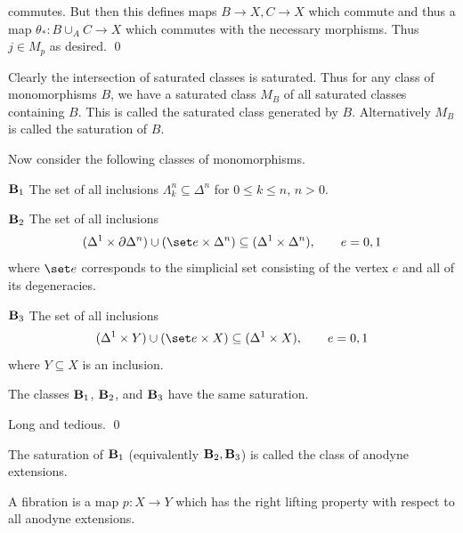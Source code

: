     \centerline{}

    commutes.
    But then this defines maps $B\to X,C\to X$ which commute and thus a map $\theta_*\colon B\cup_AC\to X$ which
    commutes with the necessary morphisms.
    Thus $j\in M_p$ as desired.
    \qed

\eproof

Clearly the intersection of saturated classes is saturated.
Thus for any class of monomorphisms $B$, we have a saturated class $M_B$ of all saturated classes containing $B$.
This is called the saturated class {\emphcolor generated} by $B$.
Alternatively $M_B$ is called the {\emphcolor saturation} of $B$.

Now consider the following classes of monomorphisms.
\bitems{1cm}
    \item{${\bf B}_1$} The set of all inclusions $\Lambda^n_k\subseteq\Delta^n$ for $0\leq k\leq n$, $n>0$.
    \item{${\bf B}_2$} The set of all inclusions
    $$ (\Delta^1\times\partial\Delta^n) \cup (\set e\times\Delta^n) \subseteq (\Delta^1\times\Delta^n),\qquad e=0,1 $$
    where $\set e$ corresponds to the simplicial set consisting of the vertex $e$ and all of its degeneracies.
    \item{${\bf B}_3$} The set of all inclusions
    $$ (\Delta^1\times Y) \cup (\set e\times X) \subseteq (\Delta^1\times X),\qquad e=0,1 $$
    where $Y\subseteq X$ is an inclusion.
\eitems

\bprop

    The classes ${\bf B}_1$, ${\bf B}_2$, and ${\bf B}_3$ have the same saturation.

\eprop

\bproof

    Long and tedious.\CITE
    \qed

\eproof

\bdefn

    The saturation of ${\bf B}_1$ (equivalently ${\bf B}_2,{\bf B}_3$) is called the class of {\emphcolor anodyne extensions}.

\edefn

\bcoro

    A fibration is a map $p\colon X\to Y$ which has the right lifting property with respect to all anodyne extensions.

